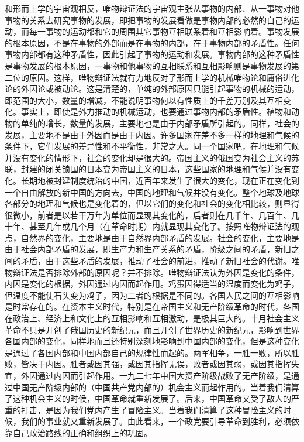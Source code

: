\documentclass[UTF8, 12pt, a4paper]{ctexrep}
\begin{document}
和形而上学的宇宙观相反，唯物辩证法的宇宙观主张从事物的内部、从一事物对他事物的关系去研究事物的发展，即把事物的发展看做是事物内部的必然的自己的运动，而每一事物的运动都和它的周围其它事物互相联系着和互相影响着。事物发展的根本原因，不是在事物的外部而是在事物的内部，在于事物内部的矛盾性。任何事物内部都有这种矛盾性，因此引起了事物的运动和发展。事物内部的这种矛盾性是事物发展的根本原因，一事物和他事物的互相联系和互相影响则是事物发展的第二位的原因。这样，唯物辩证法就有力地反对了形而上学的机械唯物论和庸俗进化论的外因论或被动论。这是清楚的，单纯的外部原因只能引起事物的机械的运动，即范围的大小，数量的增减，不能说明事物何以有性质上的千差万别及其互相变化。事实上，即使是外力推动的机械运动，也要通过事物内部的矛盾性。植物和动物的单纯的增长，数量的发展，主要地也是由于内部矛盾所引起的。同样，社会的发展，主要地不是由于外因而是由于内因。许多国家在差不多一样的地理和气候的条件下，它们发展的差异性和不平衡性，非常之大。同一个国家吧，在地理和气候并没有变化的情形下，社会的变化却是很大的。帝国主义的俄国变为社会主义的苏联，封建的闭关锁国的日本变为帝国主义的日本，这些国家的地理和气候并没有变化。长期地被封建制度统治的中国，近百年来发生了很大的变化，现在正在变化到一个自由解放的新中国的方向去，中国的地理和气候并没有变化。整个地球及地球各部分的地理和气候也是变化着的，但以它们的变化和社会的变化相比较，则显得很微小，前者是以若干万年为单位而显现其变化的，后者则在几千年、几百年、几十年、甚至几年或几个月（在革命时期）内就显现其变化了。按照唯物辩证法的观点，自然界的变化，主要地是由于自然界内部矛盾的发展。社会的变化，主要地是由于社会内部矛盾的发展，即生产力和生产关系的矛盾，阶级之间的矛盾，新旧之间的矛盾，由于这些矛盾的发展，推动了社会的前进，推动了新旧社会的代谢。唯物辩证法是否排除外部的原因呢？并不排除。唯物辩证法认为外因是变化的条件，内因是变化的根据，外因通过内因而起作用。鸡蛋因得适当的温度而变化为鸡子，但温度不能使石头变为鸡子，因为二者的根据是不同的。各国人民之间的互相影响是时常存在的。在资本主义时代，特别是在帝国主义和无产阶级革命的时代，各国在政治上、经济上和文化上的互相影响和互相激动，是极其巨大的。十月社会主义革命不只是开创了俄国历史的新纪元，而且开创了世界历史的新纪元，影响到世界各国内部的变化，同样地而且还特别深刻地影响到中国内部的变化，但是这种变化是通过了各国内部和中国内部自己的规律性而起的。两军相争，一胜一败，所以胜败，皆决于内因。胜者或因其强，或因其指挥无误，败者或因其弱，或因其指挥失宜，外因通过内因而引起作用。一九二七年中国大资产阶级战败了无产阶级，是通过中国无产阶级内部的（中国共产党内部的）机会主义而起作用的。当着我们清算了这种机会主义的时候，中国革命就重新发展了。后来，中国革命又受了敌人的严重的打击，是因为我们党内产生了冒险主义。当着我们清算了这种冒险主义的时候，我们的事业就又重新发展了。由此看来，一个政党要引导革命到胜利，必须依靠自己政治路线的正确和组织上的巩固。
\end{document}
